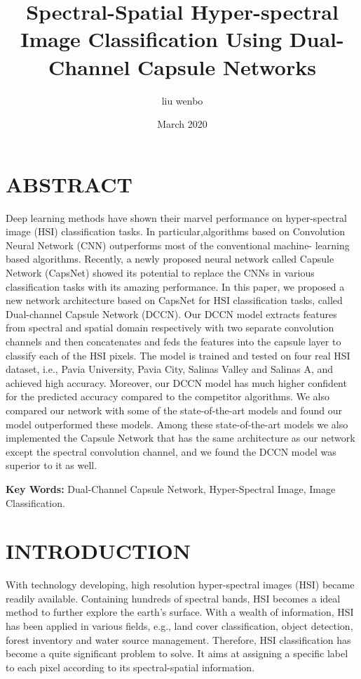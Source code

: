 \documentclass{article}
\title{Spectral-Spatial Hyper-spectral Image Classification Using Dual-Channel Capsule Networks}
\author{liu wenbo}
\date{March 2020}
\begin{document}
	

	\maketitle


	\section{ABSTRACT}\label{sec:abstract}
	Deep learning methods have shown their marvel performance on hyper-spectral image (HSI) classification tasks.
	In particular,algorithms based on Convolution Neural Network (CNN) outperforms most of the conventional machine-
	learning based algorithms.
	Recently, a newly proposed neural network called Capsule Network (CapsNet) showed its potential to replace the CNNs
	in various classification tasks with its amazing performance.
	In this paper, we proposed a new network architecture based on CapsNet for HSI classification tasks, called
	Dual-channel Capsule Network (DCCN).
	Our DCCN model extracts features from spectral and spatial domain respectively with two separate convolution
	channels and then concatenates and feds the features into the capsule layer to classify each of the HSI pixels.
	The model is trained and tested on four real HSI dataset, i.e., Pavia University, Pavia City,
	Salinas Valley and Salinas A, and achieved high accuracy.
	Moreover, our DCCN model has much higher confident for the predicted accuracy compared to the competitor algorithms.
	We also compared our network with some of the state-of-the-art models and found our model outperformed these models.
	Among these state-of-the-art models we also implemented the Capsule Network that has the same architecture as our
	network except the spectral convolution channel, and we found the DCCN model was superior to it as well.

	\noindent \textbf{Key Words:} Dual-Channel Capsule Network, Hyper-Spectral Image, Image Classification.


	\section{INTRODUCTION}\label{sec:introduction}
	With technology developing, high resolution hyper-spectral images (HSI) became readily available.
	Containing hundreds of spectral bands, HSI becomes a ideal method to further explore the earth's
	surface\cite{du2013foreword,bioucas2013hyperspectral,shippert2003introduction}.
	With a wealth of information, HSI has been applied in various fields, e.g.,
	land cover classification\cite{yan2015urban},
	object detection\cite{eslami2015developing},
	forest inventory\cite{matsuki2015hyperspectral}
	and water source management\cite{govender2007review}.
	Therefore, HSI classification has become a quite significant problem to solve.
	It aims at assigning a specific label to each pixel according to its spectral-spatial information\cite{wang2018scene}.
\end{document}
